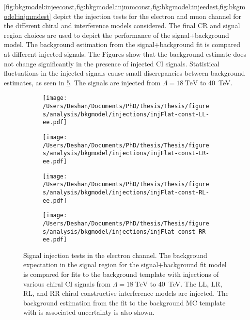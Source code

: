 \cref{fig:bkgmodel:injeeconst,fig:bkgmodel:injmmconst,fig:bkgmodel:injeedest,fig:bkgmodel:injmmdest} depict the injection tests for the electron and muon channel for the different chiral and interference models considered. The final CR and signal region choices are used to depict the performance of the signal+background model. The background estimation from the signal+background fit is compared at different injected signals. The Figures show that the background estimate does not change significantly in the presence of injected CI signals. Statistical fluctuations in the injected signals cause small discrepancies between background estimates, as seen in \cref{fig:bkgmodel:injeeconst}. The signals are injected from $\Lambda = \SI{18}{\tera\electronvolt}$ to \SI{40}{\tera\electronvolt}. 

\begin{figure}[h!]
    \centering
    \begin{subfigure}[b]{0.49\textwidth}
        \centering
        \texttt{[image: /Users/Deshan/Documents/PhD/thesis/Thesis/figures/analysis/bkgmodel/injections/injFlat-const-LL-ee.pdf]}
        \label{fig:bkgmodel:injee1}
    \end{subfigure}
    \begin{subfigure}[b]{0.49\textwidth}
        \centering
        \texttt{[image: /Users/Deshan/Documents/PhD/thesis/Thesis/figures/analysis/bkgmodel/injections/injFlat-const-LR-ee.pdf]}
        \label{fig:bkgmodel:injee3}
    \end{subfigure}
    \begin{subfigure}[b]{0.49\textwidth}
        \centering
        \texttt{[image: /Users/Deshan/Documents/PhD/thesis/Thesis/figures/analysis/bkgmodel/injections/injFlat-const-RL-ee.pdf]}
        \label{fig:bkgmodel:injee5}
    \end{subfigure}
    \begin{subfigure}[b]{0.49\textwidth}
        \centering
        \texttt{[image: /Users/Deshan/Documents/PhD/thesis/Thesis/figures/analysis/bkgmodel/injections/injFlat-const-RR-ee.pdf]}
        \label{fig:bkgmodel:injee7}
    \end{subfigure}
    \caption[Signal injection tests in the electron channel for constructive interference models]{Signal injection tests in the electron channel. The background expectation in the signal region for the signal+background fit model is compared for fits to the background template with injections of various chiral CI signals from $\Lambda = \SI{18}{\tera\electronvolt}$ to \SI{40}{\tera\electronvolt}. The LL, LR, RL, and RR chiral constructive interference models are injected. The background estimation from the fit to the background MC template with is associated uncertainty is also shown.}
    \label{fig:bkgmodel:injeeconst}
\end{figure}

